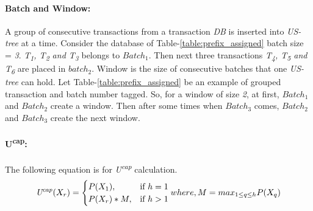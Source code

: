 \documentclass[conference]{IEEEtran}
\begin{document}
    \paragraph{Batch and Window:}
A group of consecutive transactions from a transaction \emph{DB} is inserted into \emph{US-tree} at a time. Consider the database of Table-\ref{table:prefix_assigned} batch size = \emph{3}. \emph{T\textsubscript{1}, T\textsubscript{2} and T\textsubscript{3}} belongs to $Batch_{1}$. Then next three transactions \emph{T\textsubscript{4}, T\textsubscript{5} and T\textsubscript{6}} are placed in $batch_{2}$. Window is the size of consecutive batches that one \emph{US-tree} can hold. Let Table-\ref{table:prefix_assigned} be an example of grouped transaction and batch number tagged. So, for a window of size \emph{2}, at first, $Batch_1$ and $Batch_2$ create a window. Then after some times when $Batch_3$ comes, $Batch_2$ and $Batch_3$ create the next window.
    
    \paragraph{U\textsuperscript{cap}: }
    The following equation is for \emph{U\textsuperscript{cap}} calculation.
	{\footnotesize
    \begin{equation}\label{equation:cap}
	\text{\emph{U\textsuperscript{cap}}}(X_r) =\begin{cases}
				P(X_1), & \text{if $ h = 1$}\\
				P(X_r)*M, & \text{if $ h > 1$}
             
		\end{cases}
where,\\ M=max_{1\leq q\leq h}P(X_q)
\end{equation}}
\end{document}
